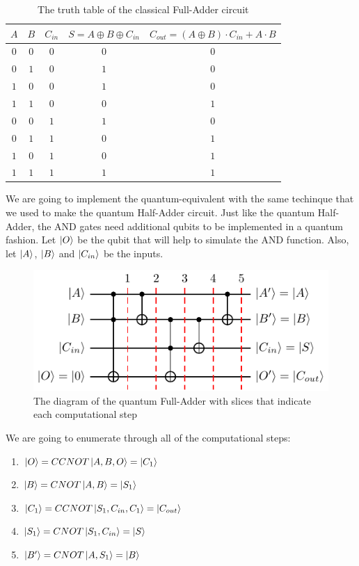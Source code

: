 \begin{table}[ht]
    \centering
    \begin{tabular}{ccc|cc}
        $A$ & $B$ & $C_{in}$ & $S = A \oplus B \oplus C_{in}$ & $C_{out} = (A \oplus B)\cdot C_{in} + A \cdot B$ \\
        \hline
        $0$ & $0$ & $0$ & $0$ & $0$ \\
        $0$ & $1$ & $0$ & $1$ & $0$ \\
        $1$ & $0$ & $0$ & $1$ & $0$ \\
        $1$ & $1$ & $0$ & $0$ & $1$ \\
        $0$ & $0$ & $1$ & $1$ & $0$ \\
        $0$ & $1$ & $1$ & $0$ & $1$ \\
        $1$ & $0$ & $1$ & $0$ & $1$ \\
        $1$ & $1$ & $1$ & $1$ & $1$ \\
    \end{tabular}
    \caption{The truth table of the classical Full-Adder circuit}
\end{table}

We are going to implement the quantum-equivalent with the same techinque that we used to make the quantum Half-Adder circuit.
Just like the quantum Half-Adder, the AND gates need additional  qubits to be implemented in a quantum fashion.
Let $\ket{O}$ be the  qubit that will help to simulate the AND function. Also, let $\ket{A}$, $\ket{B}$ and $\ket{C_{in}}$
be the inputs.

\begin{figure}[ht]
    \centering
    \includegraphics{images/5_Implementation/full_adder.pdf}
    \caption{The diagram of the quantum Full-Adder with slices that indicate each computational step}
\end{figure}

We are going to enumerate through all of the computational steps:
\begin{enumerate}
    \item $\ket{O} = CCNOT\ket{A,B,O} = \ket{C_1}$
    \item $\ket{B} = CNOT\ket{A,B} = \ket{S_1}$
    \item $\ket{C_1} = CCNOT\ket{S_1,C_{in},C_1} = \ket{C_{out}}$
    \item $\ket{S_1} = CNOT\ket{S_1,C_{in}} = \ket{S}$
    \item $\ket{B'} = CNOT\ket{A,S_1} = \ket{B}$
\end{enumerate}

